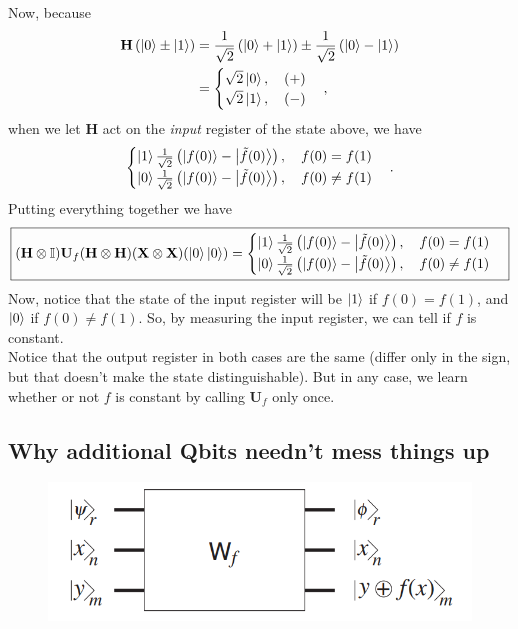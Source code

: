 \documentclass{book}
\theoremstyle{definition}
\newcommand{\nn}{\nonumber}
\newcommand{\X}{\mathbf{X}}
\newcommand{\f}[2]{\frac{#1}{#2}}
\newcommand{\lp}{\left(}
\newcommand{\rp}{\right)}
\newcommand{\Id}{\mathbb{I}}
\newcommand{\had}{\mathbf{H}}
\begin{document}
Now, because
\begin{align}
\had \lp \ket{0} \pm \ket{1} \rp  &= \f{1}{\sqrt{2}}\lp \ket{0} + \ket{1} \rp \pm \f{1}{\sqrt{2}}\lp \ket{0} - \ket{1} \rp\nn\\
&= \begin{cases}
\sqrt{2}\ket{0}, \quad (+) \\ 
\sqrt{2}\ket{1}, \quad (-)
\end{cases},
\end{align}
when we let $\had$ act on the \textit{input} register of the state above, we have
\begin{align}
\begin{cases}
\ket{1}\f{1}{\sqrt{2}}\lp \ket{f(0)} - \ket{\tilde{f}(0)} \rp, \quad f(0) = f(1)\\
\ket{0}\f{1}{\sqrt{2}}\lp \ket{f(0)} - \ket{\tilde{f}(0)} \rp, \quad f(0) \neq f(1)
\end{cases}.
\end{align}
Putting everything together we have
\begin{align}
\boxed{(\had \otimes \Id) \mathbf{U}_f (\had \otimes \had) (\X \otimes \X)(\ket{0}\ket{0}) = \begin{cases}
\ket{1}\f{1}{\sqrt{2}}\lp \ket{f(0)} - \ket{\tilde{f}(0)} \rp, \quad f(0) = f(1)\\
\ket{0}\f{1}{\sqrt{2}}\lp \ket{f(0)} - \ket{\tilde{f}(0)} \rp, \quad f(0) \neq f(1)
\end{cases}}
\end{align}
Now, notice that the state of the input register will be $\ket{1}$ if $f(0) = f(1)$, and $\ket{0}$ if $f(0) \neq f(1)$. So, by measuring the input register, we can tell if $f$ is constant. \\

Notice that the output register in both cases are the same (differ only in the sign, but that doesn't make the state distinguishable). But in any case, we learn whether or not $f$ is constant by calling $\mathbf{U}_f$ only once. 









\subsection{Why additional Qbits needn't mess things up}

\begin{figure}[!htb]
	\centering
	\includegraphics[scale=0.5]{mnr}
\end{figure}
\end{document}
